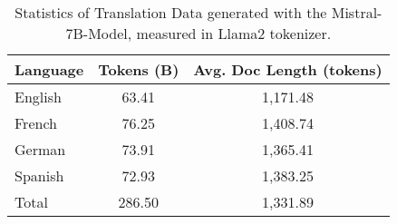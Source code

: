\begin{table}[!t]
\small
\centering
\begin{tabular}{l|cc}
\toprule
Language & \multicolumn{1}{c}{Tokens (B)} & \multicolumn{1}{c}{Avg. Doc Length (tokens)} \\
\midrule
English  & 63.41 & 1,171.48 \\
French   & 76.25 & 1,408.74 \\
German   & 73.91 & 1,365.41 \\
Spanish  & 72.93 & 1,383.25 \\
\midrule
Total &  286.50 & 1,331.89 \\
\bottomrule
\end{tabular}
\caption{Statistics of Translation Data generated with the Mistral-7B-Model, measured in Llama2 tokenizer.}
\label{tab:mistral_data_statistics}
\end{table}
